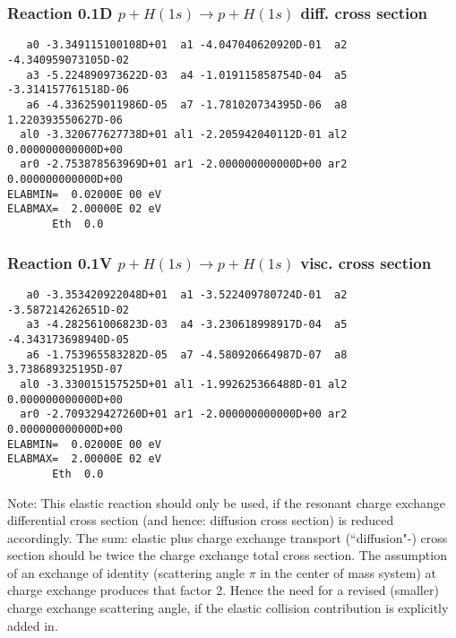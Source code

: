 \documentclass[12pt,dvipdfmx]{article}
\begin{document}
\subsubsection{
Reaction 0.1D    $ p + H(1s) \rightarrow p + H(1s)$  diff. cross
section}


\begin{small}\begin{verbatim}
   a0 -3.349115100108D+01  a1 -4.047040620920D-01  a2 -4.340959073105D-02
   a3 -5.224890973622D-03  a4 -1.019115858754D-04  a5 -3.314157761518D-06
   a6 -4.336259011986D-05  a7 -1.781020734395D-06  a8  1.220393550627D-06
  al0 -3.320677627738D+01 al1 -2.205942040112D-01 al2  0.000000000000D+00
  ar0 -2.753878563969D+01 ar1 -2.000000000000D+00 ar2  0.000000000000D+00
ELABMIN=  0.02000E 00 eV
ELABMAX=  2.00000E 02 eV
       Eth  0.0
\end{verbatim}\end{small}


\subsubsection{
Reaction 0.1V    $p + H(1s) \rightarrow p + H(1s)$ visc. cross section
}



\begin{small}\begin{verbatim}
   a0 -3.353420922048D+01  a1 -3.522409780724D-01  a2 -3.587214262651D-02
   a3 -4.282561006823D-03  a4 -3.230618998917D-04  a5 -4.343173698940D-05
   a6 -1.753965583282D-05  a7 -4.580920664987D-07  a8  3.738689325195D-07
  al0 -3.330015157525D+01 al1 -1.992625366488D-01 al2  0.000000000000D+00
  ar0 -2.709329427260D+01 ar1 -2.000000000000D+00 ar2  0.000000000000D+00
ELABMIN=  0.02000E 00 eV
ELABMAX=  2.00000E 02 eV
       Eth  0.0
\end{verbatim}\end{small}

Note: This elastic reaction should only be used, if the resonant charge
exchange differential cross section (and hence: diffusion cross section)
is reduced accordingly. The sum: elastic plus charge exchange transport
(``diffusion"-) cross section should be twice the charge exchange total
cross section. The assumption of an exchange of identity (scattering
angle $\pi$ in the center of mass system) at charge exchange produces
that factor 2. Hence the need for a revised (smaller) charge exchange
scattering angle, if the elastic collision contribution is explicitly
added in.
\end{document}
